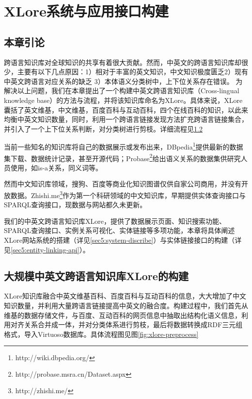 \chapter{XLore系统与应用接口构建}
\label{cha:xlore}

\section{本章引论}

跨语言知识库对全球知识的共享有着很大贡献。然而，中英文的跨语言知识库却很少，主要有以下几点原因：1）相对于丰富的英文知识，中文知识极度匮乏2）现有中英文跨语言对应关系的缺乏 3）本体语义分类树中，上下位关系存在错误。 为解决以上问题，我们在本章提出了一个构建中英文跨语言知识库（Cross-lingual knowledge base）的方法与流程，并将该知识库命名为{\heiti XLore}。具体来说，XLore囊括了英文维基，中文维基，百度百科与互动百科，四个在线百科的知识，以此来均衡中英文知识数量，同时，利用一个跨语言链接发现方法扩充跨语言链接集合，并引入了一个上下位关系判断，对分类树进行剪枝。详细流程见\ref{sec5:cross-lingual-knowledge-base}

当前一些知名的知识库将自己的数据展示或发布出来，DBpedia\footnote{http://wiki.dbpedia.org/}提供最新的数据集下载、数据统计记录，甚至开源代码；Probase\footnote{http://probase.msra.cn/Dataset.aspx}给出语义关系的数据集供研究人员使用，如is-a关系，同义词等。

然而中文知识库领域，搜狗、百度等商业化知识图谱仅供自家公司商用，并没有开放数据。Zhishi.me\footnote{http://zhishi.me/}作为第一个科研领域的中文知识库，早期提供实体查询接口与SPARQL查询接口，现数据与网站都久未更新。

我们的中英文跨语言知识库XLore，提供了数据展示页面、知识搜索功能、SPARQL查询接口、实例关系可视化、实体链接等多项功能，本章将具体阐述XLore网站系统的搭建（详见\ref{sec5:system-discribe}）与实体链接接口的构建（详见\ref{sec5:entity-linking-api}）。

\section{大规模中英文跨语言知识库XLore的构建}
\label{sec5:cross-lingual-knowledge-base}

XLore知识库融合中英文维基百科、百度百科与互动百科的信息，大大增加了中文知识数量，并利用大量跨语言链接提高中英文的融合度。构建过程中，我们首先从维基的数据存储文件，与百度、互动百科的网页信息中抽取出结构化语义信息，利用对齐关系合并成一体，并对分类体系进行剪枝，最后将数据转换成RDF三元组格式，导入Virtuoso数据库。具体流程图见图\ref{fig:xlore-preprocess}

